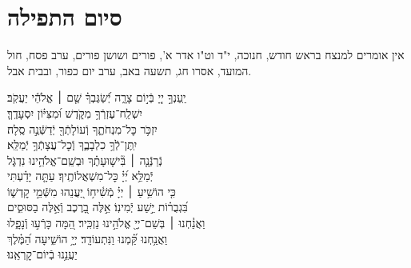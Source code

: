 \documentclass[twoside, openany, parskip=half, 11pt]{book}
\begin{document}
\hagbaha

\nextpage

\galila

\yehalelu

\negline
\kafdalet


\etzchaim






\section[סיום התפילה]{ סיום התפילה }
\label{ashrei}
\ashrei

\begin{scriptsize} %
\textsf{
אין אומרים למנצח בראש חודש, חנוכה, י"ד וט"ו אדר א', פורים ושושן פורים,
ערב פסח, חול המועד, אסרו חג, תשעה באב, ערב יום כפור, ובבית אבל.}

\end{scriptsize}

\begin{narrow}
\hfill \break
יַֽעַנְךָ֣ יְיָ֭ בְּֿי֣וֹם צָרָ֑ה \hfill יְֿ֝שַׂגֶּבְךָ֗ שֵׁ֤ם ׀ אֱלֹהֵ֬י יַעֲקֹֽב׃ \\
יִשְׁלַֽח־עֶזְרְֿךָ֥ מִקֹּ֑דֶשׁ \hfill וּ֝מִצִּיּ֗וֹן יִסְעָדֶֽךָּ׃ \\
יִזְכֹּ֥ר כׇּל־מִנְחֹתֶ֑ךָ \hfill וְֿעוֹלָתְֿךָ֖ יְֿדַשְּֿׁנֶ֣ה סֶֽלָה׃ \\
יִֽתֶּן־לְֿךָ֥ כִלְבָבֶ֑ךָ \hfill וְֽֿכׇל־עֲצָתְֿךָ֥ יְֿמַלֵּֽא׃ \\
נְֿרַנְּֿנָ֤ה ׀ בִּ֘ישׁ֤וּעָתֶ֗ךָ \hfill וּבְשֵֽׁם־אֱלֹהֵ֥ינוּ נִדְגֹּ֑ל \\ יְֿמַלֵּ֥א יְ֝יָ֗ כׇּל־מִשְׁאֲלוֹתֶֽיךָ׃ \hfill
עַתָּ֤ה יָדַ֗עְתִּי\\ כִּ֤י הוֹשִׁ֥יעַ ׀ יְיָ֗ מְֿשִׁ֫יח֥וֹ \hfill יַ֭עֲנֵהוּ מִשְּֿׁמֵ֣י קׇדְשׁ֑וֹ\\ בִּ֝גְבֻר֗וֹת יֵ֣שַׁע יְֿמִינֽוֹ׃ \hfill
אֵ֣לֶּה בָ֭רֶכֶב וְֿאֵ֣לֶּה בַסּוּסִ֑ים\\ וַאֲנַ֓חְנוּ ׀ בְּשֵׁם־יְיָ֖ אֱלֹהֵ֣ינוּ נַזְכִּֽיר׃ \hfill
הֵ֭מָּה כָּרְֿע֣וּ וְֿנָפָ֑לוּ \\ וַאֲנַ֥חְנוּ קַּ֝֗מְנוּ וַנִּתְעוֹדָֽד׃ \hfill
יְיָ֥ הוֹשִׁ֑יעָה הַ֝מֶּ֗לֶךְ\\ יַעֲנֵ֥נוּ בְֿיוֹם־קׇרְאֵֽנוּ׃ \hfill \break

\end{narrow}
\end{document}
